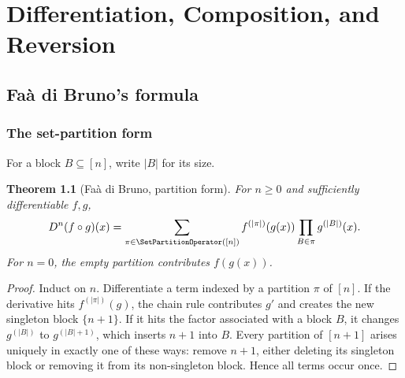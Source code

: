 \documentclass[11pt,a4paper,oneside,openany]{book}
\newtheorem{theorem}{Theorem}[chapter]
\theoremstyle{definition}
\theoremstyle{remark}
\begin{document}
\part{Differentiation, Composition, and Reversion}

\chapter{Fa\`a di Bruno's formula}

\section{The set-partition form}
For a block $B\subseteq[n]$, write $|B|$ for its size.
\begin{theorem}[Fa\`a di Bruno, partition form]\label{thm:faa-partition}
For $n\ge0$ and sufficiently differentiable $f,g$,
\begin{equation}\label{eq:faa-partition}
 D^n(f\circ g)(x)=
 \sum_{\pi\in\SetPartitionOperator([n])}
 f^{(|\pi|)}(g(x))\prod_{B\in\pi}g^{(|B|)}(x).
\end{equation}
For $n=0$, the empty partition contributes $f(g(x))$.
\end{theorem}
\begin{proof}
Induct on $n$.  Differentiate a term indexed by a partition $\pi$ of $[n]$.
If the derivative hits $f^{(|\pi|)}(g)$, the chain rule contributes $g'$ and
creates the new singleton block $\{n+1\}$.  If it hits the factor associated with
a block $B$, it changes $g^{(|B|)}$ to $g^{(|B|+1)}$, which inserts $n+1$ into
$B$.  Every partition of $[n+1]$ arises uniquely in exactly one of these ways:
remove $n+1$, either deleting its singleton block or removing it from its
non-singleton block.  Hence all terms occur once.
\end{proof}
\end{document}
